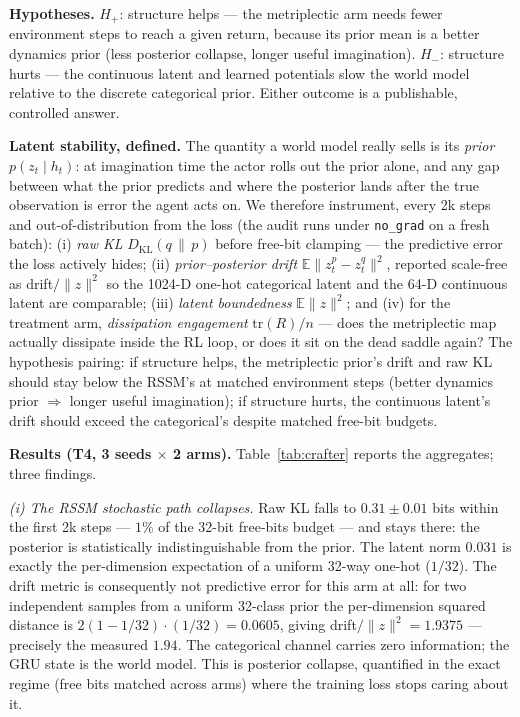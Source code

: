 \documentclass[preprint,12pt]{article}
\begin{document}
\textbf{Hypotheses.} $H_+$: structure helps --- the metriplectic arm needs
fewer environment steps to reach a given return, because its prior mean is
a better dynamics prior (less posterior collapse, longer useful
imagination). $H_-$: structure hurts --- the continuous latent and
learned potentials slow the world model relative to the discrete
categorical prior. Either outcome is a publishable, controlled answer.

\textbf{Latent stability, defined.} The quantity a world model really
sells is its \emph{prior} $p(z_t \mid h_t)$: at imagination time the actor
rolls out the prior alone, and any gap between what the prior predicts and
where the posterior lands after the true observation is error the agent
acts on. We therefore instrument, every 2k steps and out-of-distribution
from the loss (the audit runs under \texttt{no\_grad} on a fresh batch):
(i) \emph{raw KL} $D_{\mathrm{KL}}(q\,\|\,p)$ before free-bit clamping ---
the predictive error the loss actively hides; (ii) \emph{prior--posterior
drift} $\mathbb{E}\|z^p_t - z^q_t\|^2$, reported scale-free as
drift$/\|z\|^2$ so the 1024-D one-hot categorical latent and the 64-D
continuous latent are comparable; (iii) \emph{latent boundedness}
$\mathbb{E}\|z\|^2$; and (iv) for the treatment arm, \emph{dissipation
engagement} $\mathrm{tr}(R)/n$ --- does the metriplectic map actually
dissipate inside the RL loop, or does it sit on the dead saddle again?
The hypothesis pairing: if structure helps, the metriplectic prior's drift
and raw KL should stay below the RSSM's at matched environment steps
(better dynamics prior $\Rightarrow$ longer useful imagination); if
structure hurts, the continuous latent's drift should exceed the
categorical's despite matched free-bit budgets.

\textbf{Results (T4, 3 seeds $\times$ 2 arms).} Table~\ref{tab:crafter}
reports the aggregates; three findings.

\emph{(i) The RSSM stochastic path collapses.} Raw KL falls to
$0.31\pm0.01$ bits within the first 2k steps --- $1\%$ of the 32-bit
free-bits budget --- and stays there: the posterior is statistically
indistinguishable from the prior. The latent norm $0.031$ is exactly the
per-dimension expectation of a uniform 32-way one-hot ($1/32$). The
drift metric is consequently not predictive error for this arm at all: for
two independent samples from a uniform 32-class prior the per-dimension
squared distance is $2(1-1/32)\cdot(1/32)=0.0605$, giving
drift$/\|z\|^2=1.9375$ --- precisely the measured $1.94$. The categorical
channel carries zero information; the GRU state is the world model. This
is posterior collapse, quantified in the exact regime (free bits matched
across arms) where the training loss stops caring about it.
\end{document}

